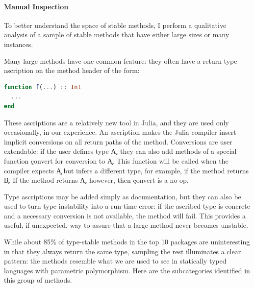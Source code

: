 \paragraph{Manual Inspection}

To better understand the space of stable methods,
I perform a qualitative analysis of a sample of stable methods that
have either large sizes or many instances.

Many large methods have one common
feature: they often have a return type ascription on the method header of
the form:
\begin{lstlisting}[language=julia]
function f(...) :: Int
  ...
end
\end{lstlisting}
These ascriptions are a relatively new tool in Julia, and they are used only
occasionally, in our experience. An ascription makes the Julia compiler insert implicit
conversions on all return paths of the method. Conversions are user extendable:
if the user defines type \c{A}, they can also add methods of a special
function \c{convert} for conversion to \c{A}. This function will be called
when the compiler expects \c{A} but infers a different type, for example,
if the method returns \c{B}.
If the method returns \c{A}, however, then \c{convert} is a no-op.

Type ascriptions may be added simply as documentation, but they can also
be used to turn type instability into a run-time error:
if the ascribed type is concrete and a necessary conversion is not available,
the method will fail. This provides a useful, if
unexpected, way to assure that a large method never becomes unstable.

While about 85\% of type-stable methods in the top 10 packages are uninteresting
in that they always return the same type, sampling the rest illuminates
a clear pattern: the methods resemble what we
are used to see in statically typed languages with parametric polymorphism.
Here are the subcategories identified in this group of methods.

